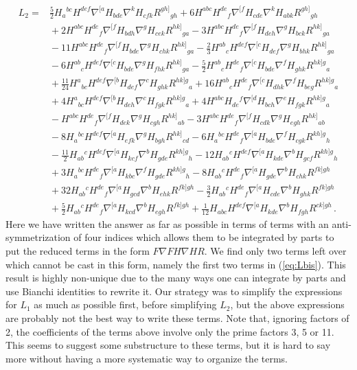 \documentclass[a4paper,11pt]{article}
\begin{document}
\fi
\begin{equation}
\begin{aligned}
L_2=
&{}
\frac52H_a{}^{bc}H^{def}\nabla^{[a}H_{bde}\nabla^kH_{cfk}R^{gh]}{}_{gh}
+6H^{abc}H^{de}{}_f\nabla^{[f}H_{cde}\nabla^kH_{abk}R^{gh]}{}_{gh}
\\&{}
+2H^{abc}H^{de}{}_f\nabla^{[f}H_{bdh}\nabla^gH_{cek}R^{hk]}{}_{ga}
-3H^{abc}H^{de}{}_f\nabla^{[f}H_{deh}\nabla^gH_{bck}R^{hk]}{}_{ga}
\\&{}
-11H^{abc}H^{de}{}_f\nabla^{[f}H_{bde}\nabla^gH_{chk}R^{hk]}{}_{ga}
-\frac23H^{ab}{}_cH^{def}\nabla^{[c}H_{def}\nabla^gH_{bhk}R^{hk]}{}_{ga}
\\&{}
-6H^{ab}{}_cH^{def}\nabla^{[c}H_{bde}\nabla^gH_{fhk}R^{hk]}{}_{ga}
-\frac52H^{ab}{}_cH^{de}{}_f\nabla^{[c}H_{bde}\nabla^fH_{ghk}R^{hk]g}{}_a
\\&{}
+\frac{11}{24}H^a{}_{bc}H^{def}\nabla^{[b}H_{def}\nabla^cH_{ghk}R^{hk]g}{}_a
+16H^{ab}{}_cH^{de}{}_f\nabla^{[c}H_{dhk}\nabla^fH_{beg}R^{hk]g}{}_a
\\&{}
+4H^a{}_{bc}H^{def}\nabla^{[b}H_{deh}\nabla^cH_{fgk}R^{hk]g}{}_a
+4H^{abc}H_{de}{}^f\nabla^{[d}H_{bch}\nabla^eH_{fgk}R^{hk]g}{}_a
\\&{}
-H^{abc}H^{de}{}_f\nabla^{[f}H_{dek}\nabla^gH_{cgh}R^{hk]}{}_{ab}
-3H^{abc}H^{de}{}_f\nabla^{[f}H_{cdk}\nabla^gH_{egh}R^{hk]}{}_{ab}
\\&{}
-8H_a{}^{bc}H^{def}\nabla^{[a}H_{efk}\nabla^gH_{bgh}R^{hk]}{}_{cd}
-6H_a{}^{bc}H^{de}{}_f\nabla^{[a}H_{bde}\nabla^fH_{cgk}R^{kh]g}{}_h
\\&{}
-\frac{11}{2}H_{ab}{}^cH^{def}\nabla^{[a}H_{kcf}\nabla^bH_{gde}R^{kh]g}{}_h
-12H_{ab}{}^cH^{def}\nabla^{[a}H_{kde}\nabla^bH_{gcf}R^{kh]g}{}_h
\\&{}
+3H_a{}^{bc}H^{de}{}_f\nabla^{[a}H_{kbc}\nabla^fH_{gde}R^{kh]g}{}_h
-8H_{ab}{}^cH^{de}{}_f\nabla^{[a}H_{gde}\nabla^bH_{chk}R^{fk]gh}
\\&{}
+32H_{ab}{}^cH^{de}{}_f\nabla^{[a}H_{gcd}\nabla^bH_{ehk}R^{fk]gh}
-\frac32H_{ab}{}^cH^{de}{}_f\nabla^{[a}H_{cde}\nabla^bH_{ghk}R^{fk]gh}
\\&{}
+\frac52H_{ab}{}^cH^{de}{}_f\nabla^{[a}H_{kcd}\nabla^bH_{egh}R^{fk]gh}
+\frac{1}{12}H_{abc}H^{def}\nabla^{[a}H_{kde}\nabla^bH_{fgh}R^{ck]gh}\,.
\end{aligned}
\label{eq:L2}
\end{equation}
Here we have written the answer as far as possible in terms of terms with an anti-symmetrization of four indices which allows them to be integrated by parts to put the reduced terms in the form $F\nabla FH\nabla HR$. We find only two terms left over which cannot be cast in this form, namely the first two terms in (\ref{eq:Lbis}). This result is highly non-unique due to the many ways one can integrate by parts and use Bianchi identities to rewrite it. Our strategy was to simplify the expressions for $L_1$ as much as possible first, before simplifying $L_2$, but the above expressions are probably not the best way to write these terms. Note that, ignoring factors of 2, the coefficients of the terms above involve only the prime factors 3, 5 or 11. This seems to suggest some substructure to these terms, but it is hard to say more without having a more systematic way to organize the terms.
\end{document}
